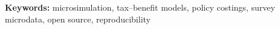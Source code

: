 \documentclass[11pt]{article}
\begin{document}
\medskip
\noindent\textbf{Keywords:} microsimulation, tax--benefit models, policy costings, survey microdata, open source, reproducibility

\newpage













\appendix

\end{document}
